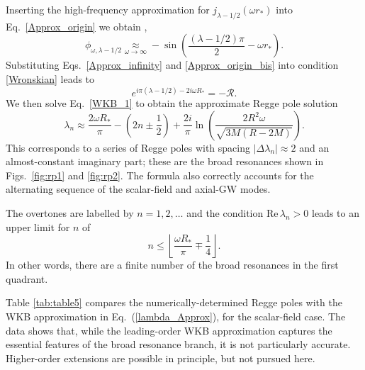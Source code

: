 \documentclass[aps,prd,longbibliography,reprint,twocolumn,amsmath,amssymb,amsfonts,showpacs,footnote,superscriptaddress]{revtex4-1}%
\begin{document}
Inserting the high-frequency approximation for $j_{\lambda-1/2} (\omega r_*)$ into Eq.~\eqref{Approx_origin} we obtain \cite{nist},
\begin{equation}\label{Approx_origin_bis}
  \phi^{}_{\omega,\lambda-1/2} \underset{\omega \to \infty}{\approx} - \sin\left(\frac{\left(\lambda-1/2\right)\pi}{2}-\omega r_*\right).
\end{equation}
Substituting Eqs.~\eqref{Approx_infinity} and \eqref{Approx_origin_bis} into condition \eqref{Wronskian} leads to
\begin{equation}\label{WKB_1}
   e^{ i\pi (\lambda-1/2)- 2 i \omega R_*}=-\mathcal{R}.
\end{equation}
%
We then solve Eq.~\eqref{WKB_1} to obtain the approximate Regge pole solution
\begin{equation}\label{lambda_Approx}
  \lambda_n \approx \frac{2 \omega R_*}{\pi}-\left(2n \pm \frac{1}{2}\right)+\frac{2 i}{\pi} \ln\left(\frac{2 R^2 \omega}{\sqrt{3M (R-2M)}}\right) .
\end{equation}
%
This corresponds to a series of Regge poles with spacing $|\Delta \lambda_n|\approx 2$ and an almost-constant imaginary part; these are the broad resonances shown in Figs.~\ref{fig:rp1} and \ref{fig:rp2}.
The formula also correctly accounts for the alternating sequence of the scalar-field and axial-GW modes.

The overtones are labelled by $n =1,2,\ldots$ and the condition $\text{Re} \, \lambda_n > 0$ leads to an upper limit for $n$ of %
\begin{equation}\label{Limit_Broad_RP}
n \leq \left\lfloor \frac{\omega R_*}{\pi} \mp \frac{1}{4}\right\rfloor.
\end{equation}
%
In other words, there are a finite number of the broad resonances in the first quadrant.

Table \ref{tab:table5} compares the numerically-determined Regge poles with the WKB approximation in Eq.~(\ref{lambda_Approx}),  for the scalar-field case. The data shows that, while the leading-order WKB approximation captures the essential features of the broad resonance branch, it is not particularly accurate. Higher-order extensions are possible in principle, but not pursued here.


\end{document}
